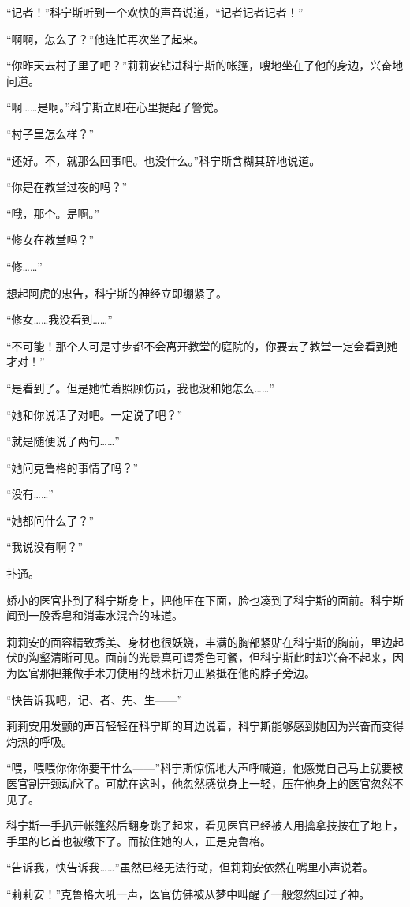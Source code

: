 “记者！”科宁斯听到一个欢快的声音说道，“记者记者记者！”

“啊啊，怎么了？”他连忙再次坐了起来。

“你昨天去村子里了吧？”莉莉安钻进科宁斯的帐篷，嗖地坐在了他的身边，兴奋地问道。

“啊……是啊。”科宁斯立即在心里提起了警觉。

“村子里怎么样？”

“还好。不，就那么回事吧。也没什么。”科宁斯含糊其辞地说道。

“你是在教堂过夜的吗？”

“哦，那个。是啊。”

“修女在教堂吗？”

“修……”

想起阿虎的忠告，科宁斯的神经立即绷紧了。

“修女……我没看到……”

“不可能！那个人可是寸步都不会离开教堂的庭院的，你要去了教堂一定会看到她才对！”

“是看到了。但是她忙着照顾伤员，我也没和她怎么……”

“她和你说话了对吧。一定说了吧？”

“就是随便说了两句……”

“她问克鲁格的事情了吗？”

“没有……”

“她都问什么了？”

“我说没有啊？”

扑通。

娇小的医官扑到了科宁斯身上，把他压在下面，脸也凑到了科宁斯的面前。科宁斯闻到一股香皂和消毒水混合的味道。

莉莉安的面容精致秀美、身材也很妖娆，丰满的胸部紧贴在科宁斯的胸前，里边起伏的沟壑清晰可见。面前的光景真可谓秀色可餐，但科宁斯此时却兴奋不起来，因为医官那把兼做手术刀使用的战术折刀正紧抵在他的脖子旁边。

“快告诉我吧，记、者、先、生——”

莉莉安用发颤的声音轻轻在科宁斯的耳边说着，科宁斯能够感到她因为兴奋而变得灼热的呼吸。

“喂，喂喂你你你要干什么——”科宁斯惊慌地大声呼喊道，他感觉自己马上就要被医官割开颈动脉了。可就在这时，他忽然感觉身上一轻，压在他身上的医官忽然不见了。

科宁斯一手扒开帐篷然后翻身跳了起来，看见医官已经被人用擒拿技按在了地上，手里的匕首也被缴下了。而按住她的人，正是克鲁格。

“告诉我，快告诉我……”虽然已经无法行动，但莉莉安依然在嘴里小声说着。

“莉莉安！”克鲁格大吼一声，医官仿佛被从梦中叫醒了一般忽然回过了神。

